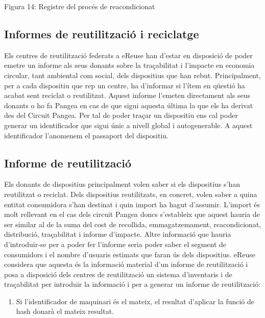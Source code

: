 \documentclass[
]{book}
\providecommand{\tightlist}{%
  \setlength{\itemsep}{0pt}\setlength{\parskip}{0pt}}
\begin{document}
Figura 14: Registre del procés de reacondicionat

\hypertarget{informes-de-reutilitzaciuxf3-i-reciclatge}{%
\subsection{Informes de reutilització i reciclatge}\label{informes-de-reutilitzaciuxf3-i-reciclatge}}

Els centres de reutilització federats a eReuse han d'estar en disposició de poder emetre un informe als seus donants sobre la traçabilitat i l'impacte en economia circular, tant ambiental com social, dels dispositius que han rebut. Principalment, per a cada dispositiu que rep un centre, ha d'informar si l'ítem en qüestió ha acabat sent reciclat o reutilitzat. Aquest informe l'emeten directament als seus donants o ho fa Pangea en cas de que sigui aquesta última la que els ha derivat des del Circuit Pangea. Per tal de poder traçar un dispositiu ens cal poder generar un identificador que sigui únic a nivell global i autogenerable. A aquest identificador l'anomenem el passaport del dispositiu.

\hypertarget{informe-de-reutilitzaciuxf3}{%
\subsection{Informe de reutilització}\label{informe-de-reutilitzaciuxf3}}

Els donants de dispositius principalment volen saber si els dispositius s'han reutilitzat o reciclat. Dels dispositius reutilitzats, en concret, volen saber a quina entitat consumidora s'han destinat i quin import ha hagut d'assumir. L'import és molt rellevant en el cas dels circuit Pangea doncs s'estableix que aquest hauria de ser similar al de la suma del cost de recollida, emmagatzemament, reacondicionat, distribució, traçabilitat i informe d'impacte. Altre informació que hauria d'introduir-se per a poder fer l'informe seria poder saber el segment de consumidors i el nombre d'usuaris estimats que faran ús dels dispositius. eReuse considera que aquesta és la informació material d'un informe de reutilització i posa a disposició dels centres de reutilització un sistema d'inventaris i de traçabilitat per introduir la informació i per a generar un informe de reutilització:

\begin{enumerate}
\def\labelenumi{\arabic{enumi}.}
\setcounter{enumi}{10}
\tightlist
\item
  Si l'identificador de maquinari és el mateix, el resultat d'aplicar la funció de hash donarà el mateix resultat.
\end{enumerate}
\end{document}
